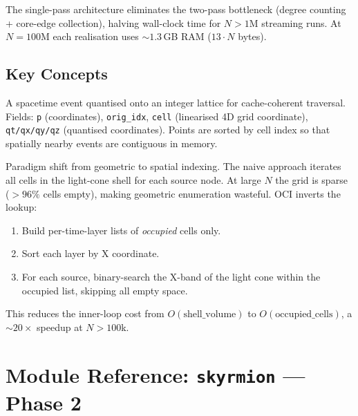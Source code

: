 \documentclass[11pt, a4paper, openany]{book}
\newcommand{\code}[1]{\texttt{#1}}
\newcommand{\modname}[1]{\texttt{\bfseries\color{main}#1}}
\begin{document}
\begin{result}
The single-pass architecture eliminates the two-pass bottleneck (degree counting
+ core-edge collection), halving wall-clock time for $N > 1$M streaming runs.
At $N = 100$M each realisation uses ${\sim}1.3$\,GB RAM ($13 \cdot N$ bytes).
\end{result}

\section{Key Concepts}

\begin{definition}[GridPoint]
A spacetime event quantised onto an integer lattice for cache-coherent
traversal.  Fields: \code{p} (coordinates), \code{orig\_idx}, \code{cell}
(linearised 4D grid coordinate), \code{qt/qx/qy/qz} (quantised coordinates).
Points are sorted by cell index so that spatially nearby events are contiguous
in memory.
\end{definition}

\begin{definition}
Paradigm shift from geometric to spatial indexing.  The naive approach iterates
all cells in the light-cone shell for each source node.  At large $N$ the grid
is sparse ($>96\%$ cells empty), making geometric enumeration wasteful.  OCI
inverts the lookup:
\begin{enumerate}
  \item Build per-time-layer lists of \emph{occupied} cells only.
  \item Sort each layer by X coordinate.
  \item For each source, binary-search the X-band of the light cone within the
        occupied list, skipping all empty space.
\end{enumerate}
This reduces the inner-loop cost from $O(\text{shell\_volume})$ to
$O(\text{occupied\_cells})$, a ${\sim}20\times$ speedup at $N > 100$k.
\end{definition}


\chapter{Module Reference: \modname{skyrmion} --- Phase 2}
\end{document}
